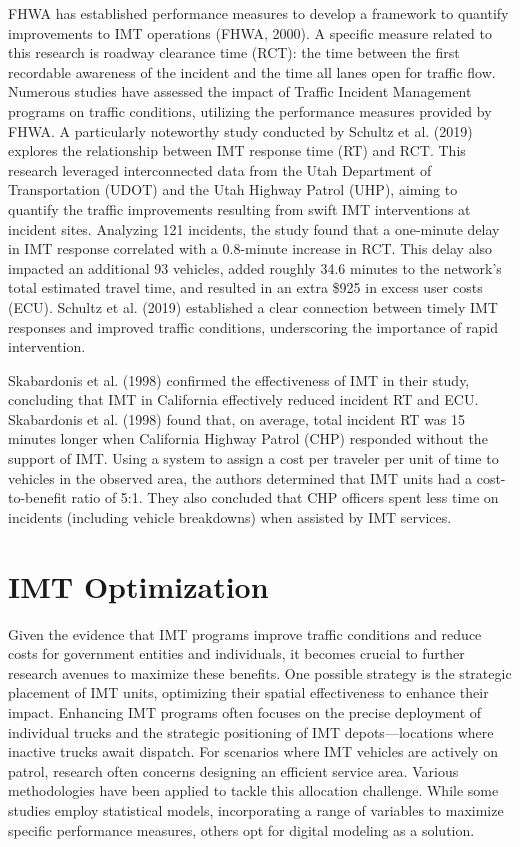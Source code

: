\documentclass[fancy, oneside, mastersfancy, ms]{byuthesis}
\begin{document}
FHWA has established performance measures to develop a framework to
quantify improvements to IMT operations (FHWA, 2000). A specific measure
related to this research is roadway clearance time (RCT): the time
between the first recordable awareness of the incident and the time all
lanes open for traffic flow. Numerous studies have assessed the impact
of Traffic Incident Management programs on traffic conditions, utilizing
the performance measures provided by FHWA. A particularly noteworthy
study conducted by Schultz et al. (2019) explores the relationship
between IMT response time (RT) and RCT. This research leveraged
interconnected data from the Utah Department of Transportation (UDOT)
and the Utah Highway Patrol (UHP), aiming to quantify the traffic
improvements resulting from swift IMT interventions at incident sites.
Analyzing 121 incidents, the study found that a one-minute delay in IMT
response correlated with a 0.8-minute increase in RCT. This delay also
impacted an additional 93 vehicles, added roughly 34.6 minutes to the
network's total estimated travel time, and resulted in an extra \$925 in
excess user costs (ECU). Schultz et al. (2019) established a clear
connection between timely IMT responses and improved traffic conditions,
underscoring the importance of rapid intervention.

Skabardonis et al. (1998) confirmed the effectiveness of IMT in their
study, concluding that IMT in California effectively reduced incident RT
and ECU. Skabardonis et al. (1998) found that, on average, total
incident RT was 15 minutes longer when California Highway Patrol (CHP)
responded without the support of IMT. Using a system to assign a cost
per traveler per unit of time to vehicles in the observed area, the
authors determined that IMT units had a cost-to-benefit ratio of 5:1.
They also concluded that CHP officers spent less time on incidents
(including vehicle breakdowns) when assisted by IMT services.

\hypertarget{sec-lit_imt_opt}{%
\section{IMT Optimization}\label{sec-lit_imt_opt}}

Given the evidence that IMT programs improve traffic conditions and
reduce costs for government entities and individuals, it becomes crucial
to further research avenues to maximize these benefits. One possible
strategy is the strategic placement of IMT units, optimizing their
spatial effectiveness to enhance their impact. Enhancing IMT programs
often focuses on the precise deployment of individual trucks and the
strategic positioning of IMT depots---locations where inactive trucks
await dispatch. For scenarios where IMT vehicles are actively on patrol,
research often concerns designing an efficient service area. Various
methodologies have been applied to tackle this allocation challenge.
While some studies employ statistical models, incorporating a range of
variables to maximize specific performance measures, others opt for
digital modeling as a solution.
\end{document}

